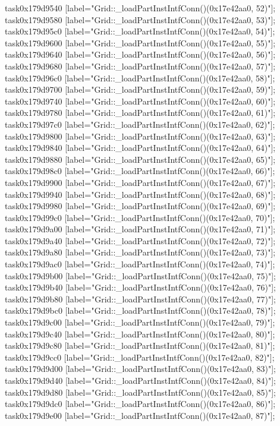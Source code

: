 {	task0x179d9540 [label="Grid::_loadPartInstIntfConn()(0x17e42aa0, 52)"];
	task0x179d9580 [label="Grid::_loadPartInstIntfConn()(0x17e42aa0, 53)"];
	task0x179d95c0 [label="Grid::_loadPartInstIntfConn()(0x17e42aa0, 54)"];
	task0x179d9600 [label="Grid::_loadPartInstIntfConn()(0x17e42aa0, 55)"];
	task0x179d9640 [label="Grid::_loadPartInstIntfConn()(0x17e42aa0, 56)"];
	task0x179d9680 [label="Grid::_loadPartInstIntfConn()(0x17e42aa0, 57)"];
	task0x179d96c0 [label="Grid::_loadPartInstIntfConn()(0x17e42aa0, 58)"];
	task0x179d9700 [label="Grid::_loadPartInstIntfConn()(0x17e42aa0, 59)"];
	task0x179d9740 [label="Grid::_loadPartInstIntfConn()(0x17e42aa0, 60)"];
	task0x179d9780 [label="Grid::_loadPartInstIntfConn()(0x17e42aa0, 61)"];
	task0x179d97c0 [label="Grid::_loadPartInstIntfConn()(0x17e42aa0, 62)"];
	task0x179d9800 [label="Grid::_loadPartInstIntfConn()(0x17e42aa0, 63)"];
	task0x179d9840 [label="Grid::_loadPartInstIntfConn()(0x17e42aa0, 64)"];
	task0x179d9880 [label="Grid::_loadPartInstIntfConn()(0x17e42aa0, 65)"];
	task0x179d98c0 [label="Grid::_loadPartInstIntfConn()(0x17e42aa0, 66)"];
	task0x179d9900 [label="Grid::_loadPartInstIntfConn()(0x17e42aa0, 67)"];
	task0x179d9940 [label="Grid::_loadPartInstIntfConn()(0x17e42aa0, 68)"];
	task0x179d9980 [label="Grid::_loadPartInstIntfConn()(0x17e42aa0, 69)"];
	task0x179d99c0 [label="Grid::_loadPartInstIntfConn()(0x17e42aa0, 70)"];
	task0x179d9a00 [label="Grid::_loadPartInstIntfConn()(0x17e42aa0, 71)"];
	task0x179d9a40 [label="Grid::_loadPartInstIntfConn()(0x17e42aa0, 72)"];
	task0x179d9a80 [label="Grid::_loadPartInstIntfConn()(0x17e42aa0, 73)"];
	task0x179d9ac0 [label="Grid::_loadPartInstIntfConn()(0x17e42aa0, 74)"];
	task0x179d9b00 [label="Grid::_loadPartInstIntfConn()(0x17e42aa0, 75)"];
	task0x179d9b40 [label="Grid::_loadPartInstIntfConn()(0x17e42aa0, 76)"];
	task0x179d9b80 [label="Grid::_loadPartInstIntfConn()(0x17e42aa0, 77)"];
	task0x179d9bc0 [label="Grid::_loadPartInstIntfConn()(0x17e42aa0, 78)"];
	task0x179d9c00 [label="Grid::_loadPartInstIntfConn()(0x17e42aa0, 79)"];
	task0x179d9c40 [label="Grid::_loadPartInstIntfConn()(0x17e42aa0, 80)"];
	task0x179d9c80 [label="Grid::_loadPartInstIntfConn()(0x17e42aa0, 81)"];
	task0x179d9cc0 [label="Grid::_loadPartInstIntfConn()(0x17e42aa0, 82)"];
	task0x179d9d00 [label="Grid::_loadPartInstIntfConn()(0x17e42aa0, 83)"];
	task0x179d9d40 [label="Grid::_loadPartInstIntfConn()(0x17e42aa0, 84)"];
	task0x179d9d80 [label="Grid::_loadPartInstIntfConn()(0x17e42aa0, 85)"];
	task0x179d9dc0 [label="Grid::_loadPartInstIntfConn()(0x17e42aa0, 86)"];
	task0x179d9e00 [label="Grid::_loadPartInstIntfConn()(0x17e42aa0, 87)"];
}
